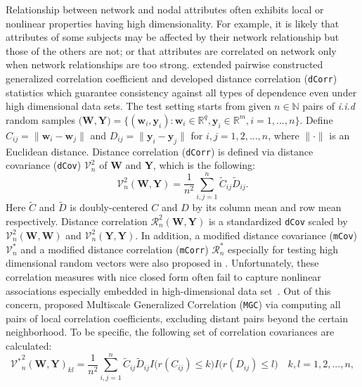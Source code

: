\documentclass[12pt]{article}
\theoremstyle{definition}
\begin{document}
Relationship between network and nodal attributes often exhibits local or nonlinear properties having high dimensionality. For example, it is likely that attributes of some subjects may be affected by their network relationship but those of the others are not; or that attributes are correlated on network only when network relationships are too strong. \cite{szekely2007measuring} extended pairwise constructed generalized correlation coefficient and developed distance correlation (\texttt{dCorr}) statistics which guarantee consistency against all types of dependence even under high dimensional data sets. The test setting starts from given $n \in \mathbb{N}$ pairs of \textit{i.i.d} random samples $\big(  \mathbf{W}, \mathbf{Y}  \big)  = \{ (\mathbf{w}_{i}, \mathbf{y}_{i}) : \mathbf{w}_{i} \in \mathbb{R}^{q}, \mathbf{y}_{i} \in \mathbb{R}^{m}, i = 1,...,n \}$. Define $C_{ij} = \parallel \mathbf{w}_{i} - \mathbf{w}_{j} \parallel$ and $D_{ij} = \parallel \mathbf{y}_{i} - \mathbf{y}_{j} \parallel$ for $i,j=1,2, \ldots ,n$, where $\parallel \cdot \parallel$ is an Euclidean distance. Distance correlation (\texttt{dCorr}) is defined via distance covariance (\texttt{dCov}) $\mathcal{V}^2_{n}$ of $\mathbf{W}$ and $\mathbf{Y}$, which is the following: 
\begin{equation}	 
\mathcal{V}^2_{n}(\mathbf{W}, \mathbf{Y}) = \frac{1}{n^2} \sum\limits_{i,j=1}^{n} \tilde{C}_{ij} \tilde{D}_{ij}.
\end{equation}
Here $\tilde{C}$ and $\tilde{D}$ is doubly-centered $C$ and $D$ by its column mean and row mean respectively. Distance correlation $\mathcal{R}^{2}_{n}(\mathbf{W}, \mathbf{Y})$ is a standardized \texttt{dCov} scaled by $\mathcal{V}^2_{n}(\mathbf{W}, \mathbf{W})$ and $\mathcal{V}^2_{n}(\mathbf{Y}, \mathbf{Y}).$ In addition, a modified distance covariance (\texttt{mCov}) $\mathcal{V}^*_{n}$ and a modified distance correlation (\texttt{mCorr}) $\mathcal{R}^{*}_{n}$ especially for testing high dimensional random vectors were also proposed in \cite{szekely2013distance}. Unfortunately, these correlation measures with nice closed form often fail to capture nonlinear associations especially embedded in high-dimensional data set~\citep{shen2016discovering, heller2012consistent}. Out of this concern, \cite{shen2016discovering} proposed Multiscale Generalized Correlation (\texttt{MGC}) via computing all pairs of local correlation coefficients, excluding distant pairs beyond the certain neighborhood. To be specific, the following set of correlation covariances are calculated:
\begin{equation}
\label{eq:MGC}
{\mathcal{V}^{*}}^2_{n} (\mathbf{W}, \mathbf{Y})_{kl} = \frac{1}{n^2} \sum\limits_{i,j=1}^{n} \tilde{C}_{ij} \tilde{D}_{ij} I \big( r(C_{ij}) \leq k \big) I \big( r(D_{ij}) \leq l  \big) \quad k,l=1,2,..., n ,
\end{equation}
\end{document}
